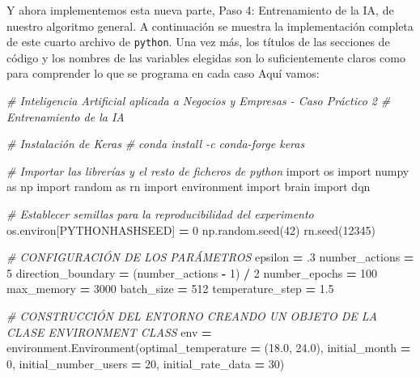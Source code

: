 \documentclass[
]{book}
\newenvironment{Shaded}{\begin{snugshade}}{\end{snugshade}}
\newcommand{\CommentTok}[1]{\textcolor[rgb]{0.56,0.35,0.01}{\textit{#1}}}
\newcommand{\DecValTok}[1]{\textcolor[rgb]{0.00,0.00,0.81}{#1}}
\newcommand{\FloatTok}[1]{\textcolor[rgb]{0.00,0.00,0.81}{#1}}
\newcommand{\ImportTok}[1]{#1}
\newcommand{\NormalTok}[1]{#1}
\newcommand{\OperatorTok}[1]{\textcolor[rgb]{0.81,0.36,0.00}{\textbf{#1}}}
\newcommand{\StringTok}[1]{\textcolor[rgb]{0.31,0.60,0.02}{#1}}
\begin{document}
Y ahora implementemos esta nueva parte, Paso 4: Entrenamiento de la IA, de nuestro algoritmo general. A continuación se muestra la implementación completa de este cuarto archivo de \texttt{python}. Una vez más, los títulos de las secciones de código y los nombres de las variables elegidas son lo suficientemente claros como para comprender lo que se programa en cada caso Aquí vamos:

\begin{Shaded}
\begin{Highlighting}[]
\CommentTok{\# Inteligencia Artificial aplicada a Negocios y Empresas {-} Caso Práctico 2}
\CommentTok{\# Entrenamiento de la IA}

\CommentTok{\# Instalación de Keras}
\CommentTok{\# conda install {-}c conda{-}forge keras}

\CommentTok{\# Importar las librerías y el resto de ficheros de python}
\ImportTok{import}\NormalTok{ os}
\ImportTok{import}\NormalTok{ numpy }\ImportTok{as}\NormalTok{ np}
\ImportTok{import}\NormalTok{ random }\ImportTok{as}\NormalTok{ rn}
\ImportTok{import}\NormalTok{ environment}
\ImportTok{import}\NormalTok{ brain}
\ImportTok{import}\NormalTok{ dqn}

\CommentTok{\# Establecer semillas para la reproducibilidad del experimento}
\NormalTok{os.environ[}\StringTok{\textquotesingle{}PYTHONHASHSEED\textquotesingle{}}\NormalTok{] }\OperatorTok{=} \StringTok{\textquotesingle{}0\textquotesingle{}}
\NormalTok{np.random.seed(}\DecValTok{42}\NormalTok{)}
\NormalTok{rn.seed(}\DecValTok{12345}\NormalTok{)}

\CommentTok{\# CONFIGURACIÓN DE LOS PARÁMETROS}
\NormalTok{epsilon }\OperatorTok{=} \FloatTok{.3}
\NormalTok{number\_actions }\OperatorTok{=} \DecValTok{5}
\NormalTok{direction\_boundary }\OperatorTok{=}\NormalTok{ (number\_actions }\OperatorTok{{-}} \DecValTok{1}\NormalTok{) }\OperatorTok{/} \DecValTok{2}
\NormalTok{number\_epochs }\OperatorTok{=} \DecValTok{100}
\NormalTok{max\_memory }\OperatorTok{=} \DecValTok{3000}
\NormalTok{batch\_size }\OperatorTok{=} \DecValTok{512}
\NormalTok{temperature\_step }\OperatorTok{=} \FloatTok{1.5}

\CommentTok{\# CONSTRUCCIÓN DEL ENTORNO CREANDO UN OBJETO DE LA CLASE ENVIRONMENT CLASS}
\NormalTok{env }\OperatorTok{=}\NormalTok{ environment.Environment(optimal\_temperature }\OperatorTok{=}\NormalTok{ (}\FloatTok{18.0}\NormalTok{, }\FloatTok{24.0}\NormalTok{),}
\NormalTok{                              initial\_month }\OperatorTok{=} \DecValTok{0}\NormalTok{,}
\NormalTok{                              initial\_number\_users }\OperatorTok{=} \DecValTok{20}\NormalTok{,}
\NormalTok{                              initial\_rate\_data }\OperatorTok{=} \DecValTok{30}\NormalTok{)}


\end{Highlighting}
\end{Shaded}
\end{document}
